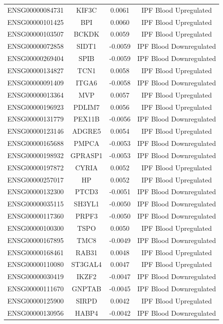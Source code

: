 \documentclass[
]{article}
\begin{document}
\begin{singlespace}
\begin{longtable}[t]{lccc}
ENSG00000084731 & KIF3C & 0.0061 & IPF Blood Upregulated\\
ENSG00000101425 & BPI & 0.0060 & IPF Blood Upregulated\\
ENSG00000103507 & BCKDK & 0.0059 & IPF Blood Upregulated\\
ENSG00000072858 & SIDT1 & -0.0059 & IPF Blood Downregulated\\
ENSG00000269404 & SPIB & -0.0059 & IPF Blood Downregulated\\
\addlinespace
ENSG00000134827 & TCN1 & 0.0058 & IPF Blood Upregulated\\
ENSG00000091409 & ITGA6 & -0.0058 & IPF Blood Downregulated\\
ENSG00000013364 & MVP & 0.0057 & IPF Blood Upregulated\\
ENSG00000196923 & PDLIM7 & 0.0056 & IPF Blood Upregulated\\
ENSG00000131779 & PEX11B & -0.0056 & IPF Blood Downregulated\\
\addlinespace
ENSG00000123146 & ADGRE5 & 0.0054 & IPF Blood Upregulated\\
ENSG00000165688 & PMPCA & -0.0053 & IPF Blood Downregulated\\
ENSG00000198932 & GPRASP1 & -0.0053 & IPF Blood Downregulated\\
ENSG00000197872 & CYRIA & 0.0052 & IPF Blood Upregulated\\
ENSG00000257017 & HP & 0.0052 & IPF Blood Upregulated\\
\addlinespace
ENSG00000132300 & PTCD3 & -0.0051 & IPF Blood Downregulated\\
ENSG00000035115 & SH3YL1 & -0.0050 & IPF Blood Downregulated\\
ENSG00000117360 & PRPF3 & -0.0050 & IPF Blood Downregulated\\
ENSG00000100300 & TSPO & 0.0050 & IPF Blood Upregulated\\
ENSG00000167895 & TMC8 & -0.0049 & IPF Blood Downregulated\\
\addlinespace
ENSG00000168461 & RAB31 & 0.0048 & IPF Blood Upregulated\\
ENSG00000110080 & ST3GAL4 & 0.0047 & IPF Blood Upregulated\\
ENSG00000030419 & IKZF2 & -0.0047 & IPF Blood Downregulated\\
ENSG00000111670 & GNPTAB & -0.0045 & IPF Blood Downregulated\\
ENSG00000125900 & SIRPD & 0.0042 & IPF Blood Upregulated\\
\addlinespace
ENSG00000130956 & HABP4 & -0.0042 & IPF Blood Downregulated\\

\end{longtable}
\end{singlespace}
\end{document}
